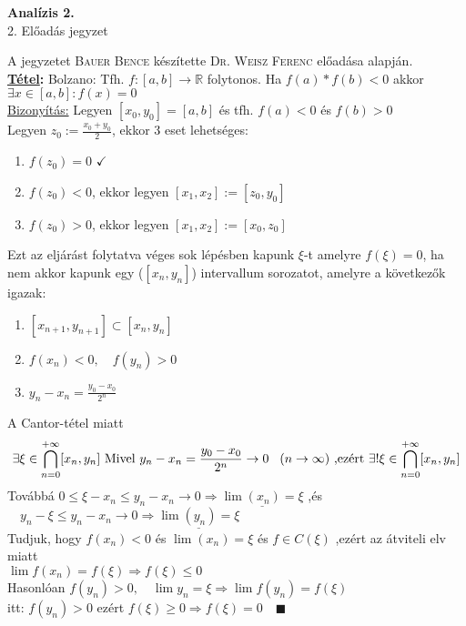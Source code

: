 \documentclass[a4paper,11pt]{article}
\begin{document}
\def\biz{\normalsize{\textbf{\underline{Bizonyítás:} }\hspace*{0.3cm}}}
\def\tetel{\large \textbf{Tétel: }}
\def\defi{\normalsize \textbf{Definíció: }}
\def\Z{\mathbb{Z}}
\def\Q{\mathbb{Q}}
\def\R{\mathbb{R}}
\def\N{\mathbb{N}}
\def\sume{\displaystyle\sum_{n=1}^{+\infty}}
\def\sumn{\displaystyle\sum_{n=0}^{+\infty}}
\def\biz{\normalsize{\underline{Bizonyítás:} }\hspace*{0.5cm}}
\def\tetel{\normalsize \textbf{\underline{Tétel}: }}
\def\narrow{\underset{n\rightarrow+\infty}{\longrightarrow}}
\def\limn{\displaystyle\lim_{n\to +\infty}}
\begin{center}
	{\LARGE\textbf{Analízis 2.}}\\[0.2cm]
	
	{\Large 2. Előadás jegyzet}\\[1cm]	
\end{center}
{\small A jegyzetet \textsc{Bauer Bence} készítette \textsc{Dr. Weisz Ferenc} előadása alapján.}\\[0.2cm]
\tetel Bolzano: Tfh. $f: [a,b] \to \R$ folytonos. Ha $f(a)*f(b) < 0$ akkor $\exists x \in [a,b]: f(x) = 0$\\[0.1cm]
\biz Legyen $ [x_0,y_0] = [a,b] $ és tfh. $f(a) < 0$ és $f(b) > 0 $\\[0.1cm] Legyen $z_0 := \frac{x_0+y_0}{2}$, ekkor 3 eset lehetséges: 
\begin{enumerate}
	\item $f(z_0) = 0$ $\checkmark$
	\item $f(z_0) < 0$, ekkor legyen $[x_1,x_2] := [z_0,y_0]$
	\item $f(z_0) > 0$, ekkor legyen $[x_1,x_2] := [x_0,z_0]$
\end{enumerate}
Ezt az eljárást folytatva véges sok lépésben kapunk $\xi$-t amelyre $f(\xi) = 0$, ha nem akkor kapunk egy ($[x_n,y_n]$) intervallum sorozatot, amelyre a következők igazak:
\begin{enumerate}
	\item $[x_{n+1},y_{n+1}]\subset[x_n,y_n]$
	\item $f(x_n) < 0,\quad f(y_n) > 0$
	\item $y_n - x_n = \frac{y_0-x_0}{2^n}$
\end{enumerate}
A Cantor-tétel miatt \[ \exists\xi\in\bigcap_{n=0}^{+\infty}[x_n,y_n] \text{ Mivel } y_n-x_n = \frac{y_0-x_0}{2^n} \to 0 \hspace*{0.3cm} (n \to \infty) \text{ ,ezért  } \exists ! \xi \in\bigcap_{n=0}^{+\infty}[x_n,y_n] \]
Továbbá $0 \leq \xi - x_n \leq y_n-x_n \to 0 \Rightarrow \underline{\lim(x_n) = \xi}$ ,és $\quad y_n-\xi \leq y_n-x_n \to 0 \Rightarrow \underline{\lim(y_n) = \xi}$ \\[0.2cm] Tudjuk, hogy $f(x_n) < 0$ és $\lim(x_n) = \xi$ és $f\in C(\xi)$ ,ezért az átviteli elv miatt\\ $\lim f(x_n) = f(\xi) \Rightarrow f(\xi) \leq 0$\\[0.1cm] Hasonlóan $f(y_n) > 0,\quad \lim y_n = \xi \Rightarrow \lim f(y_n) = f(\xi)$\\itt: $f(y_n) > 0$ ezért $f(\xi) \geq 0 \Rightarrow f(\xi) = 0\quad \blacksquare$\\[0.2cm]
\end{document}
